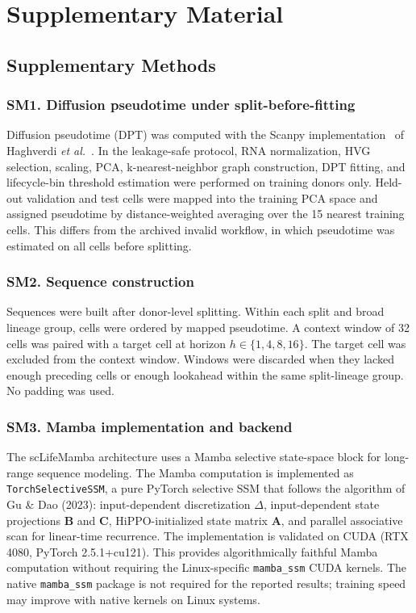 \documentclass[11pt]{article}
\begin{document}
\setcounter{figure}{0}
\renewcommand{\thefigure}{S\arabic{figure}}
\setcounter{table}{0}
\renewcommand{\thetable}{S\arabic{table}}

\section*{Supplementary Material}

\subsection*{Supplementary Methods}

\subsubsection*{SM1. Diffusion pseudotime under split-before-fitting}
Diffusion pseudotime (DPT) was computed with the Scanpy implementation~\citep{wolf2018} of Haghverdi \textit{et al.}~\citep{haghverdi2016}. In the leakage-safe protocol, RNA normalization, HVG selection, scaling, PCA, k-nearest-neighbor graph construction, DPT fitting, and lifecycle-bin threshold estimation were performed on training donors only. Held-out validation and test cells were mapped into the training PCA space and assigned pseudotime by distance-weighted averaging over the 15 nearest training cells. This differs from the archived invalid workflow, in which pseudotime was estimated on all cells before splitting.

\subsubsection*{SM2. Sequence construction}
Sequences were built after donor-level splitting. Within each split and broad lineage group, cells were ordered by mapped pseudotime. A context window of 32 cells was paired with a target cell at horizon $h \in \{1,4,8,16\}$. The target cell was excluded from the context window. Windows were discarded when they lacked enough preceding cells or enough lookahead within the same split-lineage group. No padding was used.

\subsubsection*{SM3. Mamba implementation and backend}
The scLifeMamba architecture uses a Mamba selective state-space block for long-range sequence modeling. The Mamba computation is implemented as \texttt{TorchSelectiveSSM}, a pure PyTorch selective SSM that follows the algorithm of Gu \& Dao (2023): input-dependent discretization $\Delta$, input-dependent state projections $\mathbf{B}$ and $\mathbf{C}$, HiPPO-initialized state matrix $\mathbf{A}$, and parallel associative scan for linear-time recurrence. The implementation is validated on CUDA (RTX 4080, PyTorch 2.5.1+cu121). This provides algorithmically faithful Mamba computation without requiring the Linux-specific \texttt{mamba\_ssm} CUDA kernels. The native \texttt{mamba\_ssm} package is not required for the reported results; training speed may improve with native kernels on Linux systems.
\end{document}

